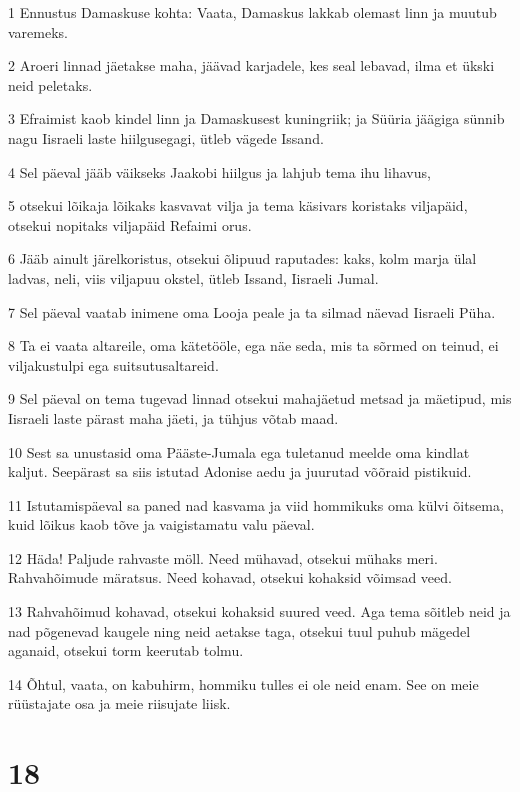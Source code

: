 \par 1 Ennustus Damaskuse kohta: Vaata, Damaskus lakkab olemast linn ja muutub varemeks.
\par 2 Aroeri linnad jäetakse maha, jäävad karjadele, kes seal lebavad, ilma et ükski neid peletaks.
\par 3 Efraimist kaob kindel linn ja Damaskusest kuningriik; ja Süüria jäägiga sünnib nagu Iisraeli laste hiilgusegagi, ütleb vägede Issand.
\par 4 Sel päeval jääb väikseks Jaakobi hiilgus ja lahjub tema ihu lihavus,
\par 5 otsekui lõikaja lõikaks kasvavat vilja ja tema käsivars koristaks viljapäid, otsekui nopitaks viljapäid Refaimi orus.
\par 6 Jääb ainult järelkoristus, otsekui õlipuud raputades: kaks, kolm marja ülal ladvas, neli, viis viljapuu okstel, ütleb Issand, Iisraeli Jumal.
\par 7 Sel päeval vaatab inimene oma Looja peale ja ta silmad näevad Iisraeli Püha.
\par 8 Ta ei vaata altareile, oma kätetööle, ega näe seda, mis ta sõrmed on teinud, ei viljakustulpi ega suitsutusaltareid.
\par 9 Sel päeval on tema tugevad linnad otsekui mahajäetud metsad ja mäetipud, mis Iisraeli laste pärast maha jäeti, ja tühjus võtab maad.
\par 10 Sest sa unustasid oma Pääste-Jumala ega tuletanud meelde oma kindlat kaljut. Seepärast sa siis istutad Adonise aedu ja juurutad võõraid pistikuid.
\par 11 Istutamispäeval sa paned nad kasvama ja viid hommikuks oma külvi õitsema, kuid lõikus kaob tõve ja vaigistamatu valu päeval.
\par 12 Häda! Paljude rahvaste möll. Need mühavad, otsekui mühaks meri. Rahvahõimude märatsus. Need kohavad, otsekui kohaksid võimsad veed.
\par 13 Rahvahõimud kohavad, otsekui kohaksid suured veed. Aga tema sõitleb neid ja nad põgenevad kaugele ning neid aetakse taga, otsekui tuul puhub mägedel aganaid, otsekui torm keerutab tolmu.
\par 14 Õhtul, vaata, on kabuhirm, hommiku tulles ei ole neid enam. See on meie rüüstajate osa ja meie riisujate liisk.

\chapter{18}

